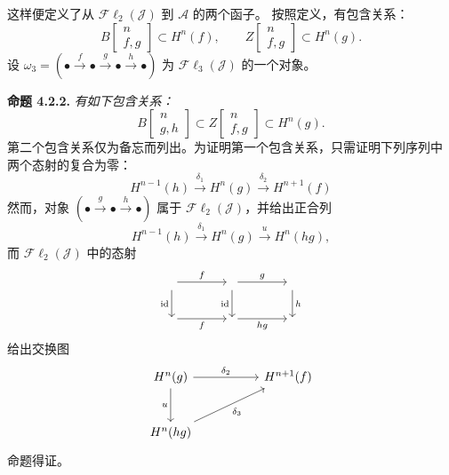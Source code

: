 \clearpage
{}%
\begingroup\small\setlength{\parskip}{0pt}\setlength{\emergencystretch}{1.5em}
这样便定义了从 $\mathcal{F}\ell_2(\mathcal J)$ 到 $\mathcal A$ 的两个函子。
按照定义，有包含关系：
\[
B\!\left[\begin{smallmatrix}n\\f,g\end{smallmatrix}\right]\subset H^n(f),
\qquad
Z\!\left[\begin{smallmatrix}n\\f,g\end{smallmatrix}\right]\subset H^n(g).
\]
设
$\omega_3=(\mathord\bullet\xrightarrow f\mathord\bullet\xrightarrow g
\mathord\bullet\xrightarrow h\mathord\bullet)$ 为
$\mathcal{F}\ell_3(\mathcal J)$ 的一个对象。

\medskip\noindent\textbf{命题 4.2.2.}\quad
\textit{有如下包含关系：}
\[
B\!\left[\begin{smallmatrix}n\\g,h\end{smallmatrix}\right]
\subset
Z\!\left[\begin{smallmatrix}n\\f,g\end{smallmatrix}\right]
\subset H^n(g).
\]
第二个包含关系仅为备忘而列出。为证明第一个包含关系，只需证明下列序列中
两个态射的复合为零：
\[
H^{n-1}(h)\xrightarrow{\delta_1}H^n(g)
\xrightarrow{\delta_2}H^{n+1}(f)
\]
然而，对象
$(\mathord\bullet\xrightarrow g\mathord\bullet\xrightarrow h\mathord\bullet)$
属于 $\mathcal{F}\ell_2(\mathcal J)$，并给出正合列
\[
H^{n-1}(h)\xrightarrow{\delta_1}H^n(g)
\xrightarrow u H^n(hg),
\]
而 $\mathcal{F}\ell_2(\mathcal J)$ 中的态射
\[
\begin{tikzcd}[column sep=4em,row sep=2.2em]
{}\arrow[r,"f"]\arrow[d,"\operatorname{id}"']&{}
 \arrow[r,"g"]\arrow[d,"\operatorname{id}"']&{}\arrow[d,"h"]\\
{}\arrow[r,"f"']&{}\arrow[r,"hg"']&{}
\end{tikzcd}
\]
给出交换图
\[
\begin{tikzcd}[column sep=5em,row sep=2.7em]
H^n(g)\arrow[r,"\delta_2"]\arrow[d,"u"']&H^{n+1}(f)\\
H^n(hg)\arrow[ur,"\delta_3"']&{}
\end{tikzcd}
\]
命题得证。
\endgroup

